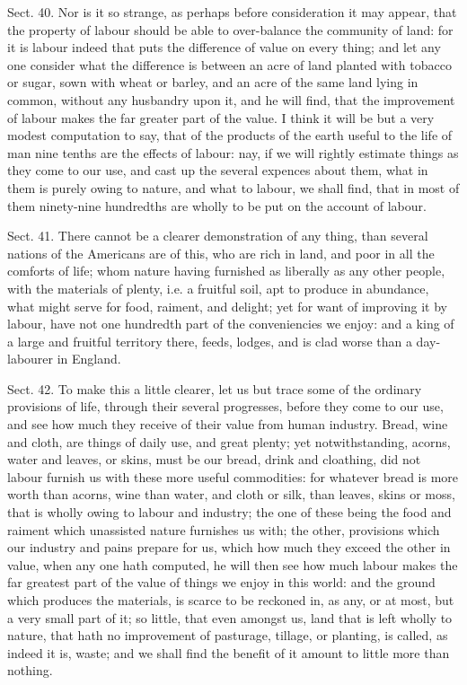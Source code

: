 \documentclass[11pt,openany]{book}
\begin{document}
Sect. 40. Nor is it so strange, as perhaps before consideration it may appear, that the property of labour should be able to over-balance the community of land: for it is labour indeed that puts the difference of value on every thing; and let any one consider what the difference is between an acre of land planted with tobacco or sugar, sown with wheat or barley, and an acre of the same land lying in common, without any husbandry upon it, and he will find, that the improvement of labour makes the far greater part of the value. I think it will be but a very modest computation to say, that of the products of the earth useful to the life of man nine tenths are the effects of labour: nay, if we will rightly estimate things as they come to our use, and cast up the several expences about them, what in them is purely owing to nature, and what to labour, we shall find, that in most of them ninety-nine hundredths are wholly to be put on the account of labour.

Sect. 41. There cannot be a clearer demonstration of any thing, than several nations of the Americans are of this, who are rich in land, and poor in all the comforts of life; whom nature having furnished as liberally as any other people, with the materials of plenty, i.e. a fruitful soil, apt to produce in abundance, what might serve for food, raiment, and delight; yet for want of improving it by labour, have not one hundredth part of the conveniencies we enjoy: and a king of a large and fruitful territory there, feeds, lodges, and is clad worse than a day-labourer in England.

Sect. 42. To make this a little clearer, let us but trace some of the ordinary provisions of life, through their several progresses, before they come to our use, and see how much they receive of their value from human industry. Bread, wine and cloth, are things of daily use, and great plenty; yet notwithstanding, acorns, water and leaves, or skins, must be our bread, drink and cloathing, did not labour furnish us with these more useful commodities: for whatever bread is more worth than acorns, wine than water, and cloth or silk, than leaves, skins or moss, that is wholly owing to labour and industry; the one of these being the food and raiment which unassisted nature furnishes us with; the other, provisions which our industry and pains prepare for us, which how much they exceed the other in value, when any one hath computed, he will then see how much labour makes the far greatest part of the value of things we enjoy in this world: and the ground which produces the materials, is scarce to be reckoned in, as any, or at most, but a very small part of it; so little, that even amongst us, land that is left wholly to nature, that hath no improvement of pasturage, tillage, or planting, is called, as indeed it is, waste; and we shall find the benefit of it amount to little more than nothing.
\end{document}
